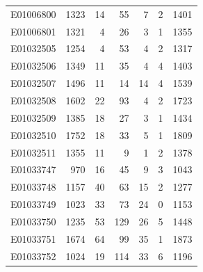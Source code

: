 \documentclass[
  letterpaper,
  DIV=11,
  numbers=noendperiod]{scrreprt}
\begin{document}
\begin{tabular}{lrrrrrr}
E01006800     &    1323 &      14 &                    55 &                               7 &                       2 &              1401 \\
E01006801     &    1321 &       4 &                    26 &                               3 &                       1 &              1355 \\
E01032505     &    1254 &       4 &                    53 &                               4 &                       2 &              1317 \\
E01032506     &    1349 &      11 &                    35 &                               4 &                       4 &              1403 \\
E01032507     &    1496 &      11 &                    14 &                              14 &                       4 &              1539 \\
E01032508     &    1602 &      22 &                    93 &                               4 &                       2 &              1723 \\
E01032509     &    1385 &      18 &                    27 &                               3 &                       1 &              1434 \\
E01032510     &    1752 &      18 &                    33 &                               5 &                       1 &              1809 \\
E01032511     &    1355 &      11 &                     9 &                               1 &                       2 &              1378 \\
E01033747     &     970 &      16 &                    45 &                               9 &                       3 &              1043 \\
E01033748     &    1157 &      40 &                    63 &                              15 &                       2 &              1277 \\
E01033749     &    1023 &      33 &                    73 &                              24 &                       0 &              1153 \\
E01033750     &    1235 &      53 &                   129 &                              26 &                       5 &              1448 \\
E01033751     &    1674 &      64 &                    99 &                              35 &                       1 &              1873 \\
E01033752     &    1024 &      19 &                   114 &                              33 &                       6 &              1196 \\

\end{tabular}
\end{document}
